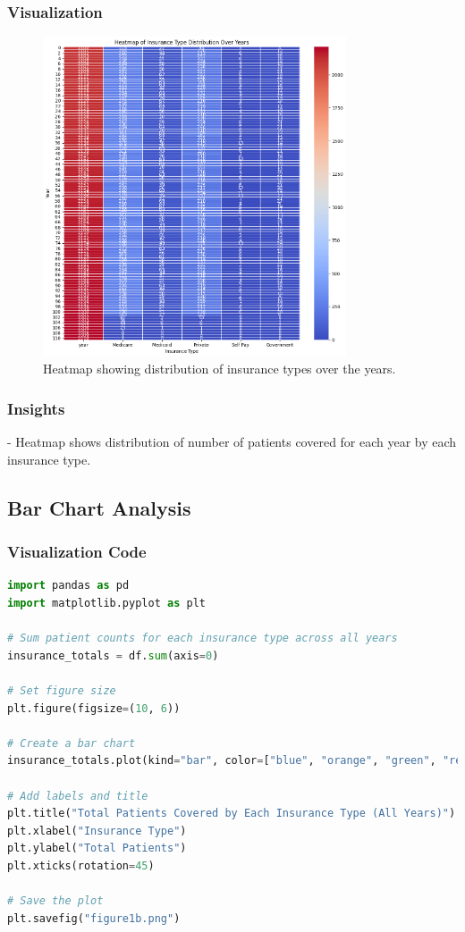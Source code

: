 \documentclass[a4paper,10pt]{article}
\begin{document}
\subsubsection{Visualization}

\begin{figure}[h]
    \centering
    \includegraphics[width=0.8\textwidth]{figure1a.png}
    \caption{Heatmap showing distribution of insurance types over the years.}
    \label{fig:heatmap}
\end{figure}

\subsubsection{Insights}
- Heatmap shows distribution of number of patients covered for each year by each insurance type.

\subsection{Bar Chart Analysis}

\subsubsection{Visualization Code}
\begin{lstlisting}[language=Python]
import pandas as pd
import matplotlib.pyplot as plt

# Sum patient counts for each insurance type across all years
insurance_totals = df.sum(axis=0)

# Set figure size
plt.figure(figsize=(10, 6))

# Create a bar chart
insurance_totals.plot(kind="bar", color=["blue", "orange", "green", "red", "purple"])

# Add labels and title
plt.title("Total Patients Covered by Each Insurance Type (All Years)")
plt.xlabel("Insurance Type")
plt.ylabel("Total Patients")
plt.xticks(rotation=45)

# Save the plot
plt.savefig("figure1b.png")
\end{lstlisting}
\end{document}
